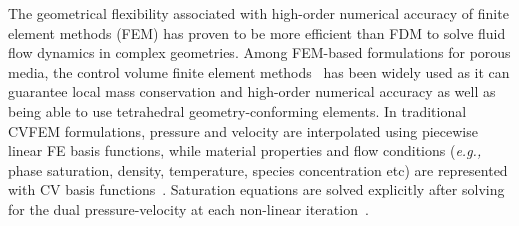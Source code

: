 \documentclass[preprint,authoryear,12pt]{elsarticle}
\newcommand{\eg}{{\it e.g., }}
\begin{document}
\medskip
The geometrical flexibility associated with high-order numerical accuracy of finite element methods (FEM) has proven to be more efficient than FDM to solve fluid flow dynamics in complex geometries. %
Among FEM-based formulations for porous media, the control volume finite element methods~\citep[CVFEM,][]{fung_1992} has been widely used as it can guarantee local mass conservation and high-order numerical accuracy as well as being able to use tetrahedral geometry-conforming elements. In traditional CVFEM formulations, pressure and velocity are interpolated using piecewise linear FE basis functions, %
while material properties and flow conditions (\eg phase saturation, density, temperature, species concentration etc) are represented with CV basis functions~\citep{voller_2009}. Saturation equations are solved explicitly after solving for the dual pressure-velocity at each non-linear iteration~\citep[a detailed description of the implicit pressure explicit saturation, IMPES, formulation can be found in][]{chen_2006,lux_2012}.

\end{document}
